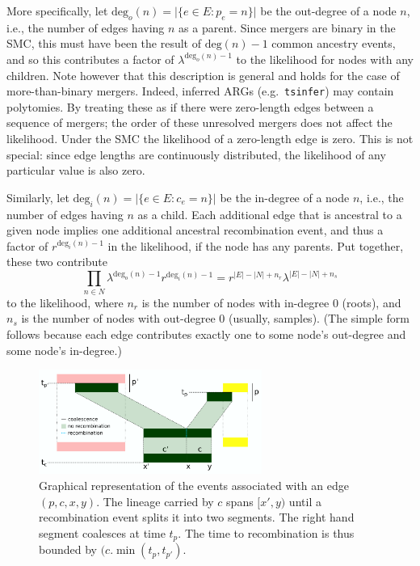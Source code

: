 \documentclass{article}
\renewcommand{\deg}{\mathrm{deg}}
\begin{document}
More specifically,
let $\deg_o(n) = \vert\{e \in E : p_e=n\}\vert$ be the out-degree of a node $n$,
i.e., the number of edges having $n$ as a parent.
Since mergers are binary in the SMC,
this must have been the result of $\deg(n) - 1$ common ancestry events,
and so this contributes a factor of $\lambda^{\deg_o(n)-1}$ to the likelihood
for nodes with any children.
Note however that this description is general and holds for the case of
more-than-binary mergers. Indeed, inferred ARGs (e.g.\ \texttt{tsinfer}) may
contain polytomies. By treating these as if there were zero-length edges
between a sequence of mergers; the order of these unresolved mergers does 
not affect the likelihood. Under the SMC the likelihood of a zero-length edge is zero.
This is not special: since edge lengths are continuously distributed,
the likelihood of any particular value is also zero.

Similarly,
let $\deg_i(n) = \vert\{e \in E : c_e=n\}\vert$ be the in-degree of a node $n$,
i.e., the number of edges having $n$ as a child.
Each additional edge that is ancestral to a given node
implies one additional ancestral recombination event,
and thus a factor of  $r^{\deg_i(n)-1}$ in the likelihood,
if the node has any parents.
Put together, these two contribute
\begin{equation}\label{eq:coal}
    \prod_{n \in N} \lambda^{\deg_o(n)-1} r^{\deg_i(n)-1}  
    =
    r^{|E|-|N|+n_r} 
    \lambda^{|E|-|N|+n_s} 
\end{equation}
to the likelihood,
where $n_r$ is the number of nodes with in-degree 0 (roots),
and $n_s$ is the number of nodes with out-degree 0 (usually, samples).
(The simple form follows because each edge contributes exactly one
to some node's out-degree and some node's in-degree.)


\begin{figure}
    \centering
    \includegraphics[width=0.65\textwidth]{figures/single_event.png}
    \caption{
        Graphical representation of the events associated with an edge $(p,c,x,y)$.
        The lineage carried by $c$ spans $[x',y)$ until a recombination event splits it
        into two segments. The right hand segment coalesces at time $t_p$. The time to
        recombination is thus bounded by $(c. \min(t_p, t_{p'})$.
        \label{fig:likelihood}
    }
\end{figure}
\end{document}
